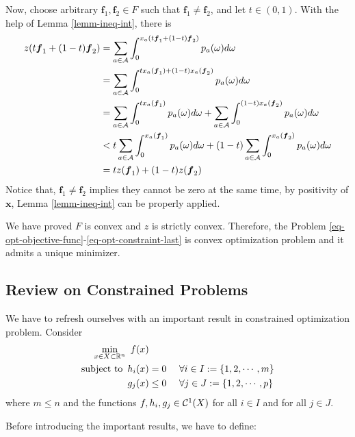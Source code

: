 \documentclass{article}
\begin{document}
Now, choose arbitrary $ \boldsymbol{f}_1, \boldsymbol{f}_2 \in F $ such that $ \boldsymbol{f}_1 \neq \boldsymbol{f}_2 $, and let $ t \in (0, 1) $. With the help of Lemma \ref{lemm-ineq-int}, there is
\begin{align}
    z (t \boldsymbol{f}_1 + (1-t) \boldsymbol{f}_2) &= \sum_{a \in \mathcal{A}} \int_0^{x_a (t \boldsymbol{f}_1 + (1-t) \boldsymbol{f}_2)} p_a (\omega) d \omega \\ 
    &= \sum_{a \in \mathcal{A}} \int_0^{t x_a (\boldsymbol{f}_1) + (1-t) x_a (\boldsymbol{f}_2)} p_a (\omega) d \omega \\
    &= \sum_{a \in \mathcal{A}} \int_0^{t x_a (\boldsymbol{f}_1)} p_a (\omega) d \omega + \sum_{a \in \mathcal{A}} \int_0^{(1-t) x_a (\boldsymbol{f}_2)} p_a (\omega) d \omega \\
    &<  t \sum_{a \in \mathcal{A}} \int_0^{x_a (\boldsymbol{f}_1)} p_a (\omega) d \omega + (1 - t) \sum_{a \in \mathcal{A}} \int_0^{x_a (\boldsymbol{f}_2)} p_a (\omega) d \omega \\ 
    &= t z(\boldsymbol{f}_1) + (1 - t) z (\boldsymbol{f}_2)
\end{align}
Notice that, $ \boldsymbol{f}_1 \neq \boldsymbol{f}_2 $ implies they cannot be zero at the same time, by positivity of $ \boldsymbol{x} $, Lemma \ref{lemm-ineq-int} can be properly applied.

We have proved $ F $ is convex and $ z $ is strictly convex. Therefore, the Problem \ref{eq-opt-objective-func}-\ref{eq-opt-constraint-last} is convex optimization problem and it admits a unique minimizer.

\subsection{Review on Constrained Problems}

We have to refresh ourselves with an important result in constrained optimization problem. Consider
\begin{align} \label{pb-obj-function}
    \min_{x \in X \subset \mathbb{R}^n}~ f(x) & \\ 
    \operatorname{subject~to}~ h_i (x) &= 0 ~~~~ \forall i \in I := \{1, 2, \cdots, m\} \\
    g_j (x) &\le 0 ~~~~ \forall j \in J := \{1, 2, \cdots, p\} \label{pb-last-constraint}
\end{align}
where $ m \le n $ and the functions $ f, h_i, g_j \in \mathcal{C}^1(X) $ for all $ i \in I $ and for all $ j \in J $. 

Before introducing the important results, we have to define:
\end{document}
